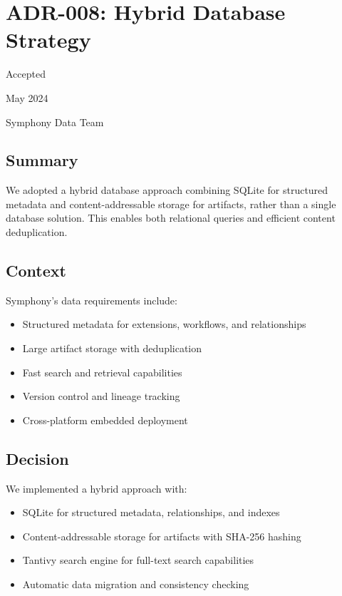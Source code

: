 \section*{ADR-008: Hybrid Database Strategy}

\begin{description}[leftmargin=3cm,labelwidth=2.5cm]
\item[\textbf{Status}] Accepted
\item[\textbf{Date}] May 2024
\item[\textbf{Authors}] Symphony Data Team
\end{description}

\subsection*{Summary}

We adopted a hybrid database approach combining SQLite for structured metadata and content-addressable storage for artifacts, rather than a single database solution. This enables both relational queries and efficient content deduplication.

\subsection*{Context}

Symphony's data requirements include:
\begin{itemize}
\item Structured metadata for extensions, workflows, and relationships
\item Large artifact storage with deduplication
\item Fast search and retrieval capabilities
\item Version control and lineage tracking
\item Cross-platform embedded deployment
\end{itemize}

\subsection*{Decision}

We implemented a hybrid approach with:
\begin{itemize}
\item SQLite for structured metadata, relationships, and indexes
\item Content-addressable storage for artifacts with SHA-256 hashing
\item Tantivy search engine for full-text search capabilities
\item Automatic data migration and consistency checking
\end{itemize}

